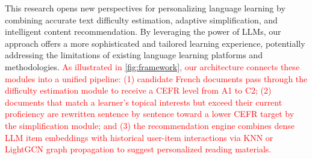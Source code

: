 This research opens new perspectives for personalizing language learning by combining accurate text difficulty estimation, adaptive simplification, and intelligent content recommendation. By leveraging the power of LLMs, our approach offers a more sophisticated and tailored learning experience, potentially addressing the limitations of existing language learning platforms and methodologies. \textcolor{red}{As illustrated in \autoref{fig:framework}, our architecture connects these modules into a unified pipeline: (1) candidate French documents pass through the difficulty estimation module to receive a CEFR level from A1 to C2; (2) documents that match a learner's topical interests but exceed their current proficiency are rewritten sentence by sentence toward a lower CEFR target by the simplification module; and (3) the recommendation engine combines dense LLM item embeddings with historical user-item interactions via KNN or LightGCN graph propagation to suggest personalized reading materials.}


